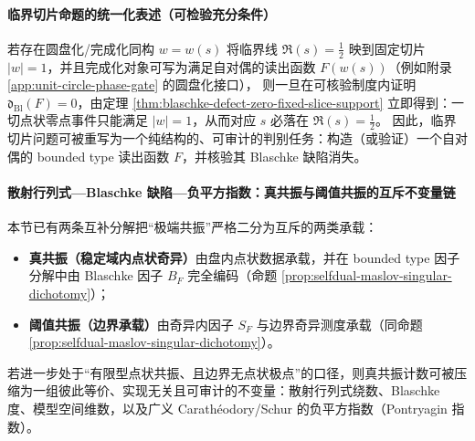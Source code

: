 \paragraph{临界切片命题的统一化表述（可检验充分条件）}
若存在圆盘化/完成化同构 \(w=w(s)\) 将临界线 \(\Re(s)=\tfrac12\) 映到固定切片 \(|w|=1\)，并且完成化对象可写为满足自对偶的读出函数 \(F(w(s))\)（例如附录 \ref{app:unit-circle-phase-gate} 的圆盘化接口），
则一旦在可核验制度内证明 \(\mathfrak{d}_{\mathrm{Bl}}(F)=0\)，由定理 \ref{thm:blaschke-defect-zero-fixed-slice-support} 立即得到：一切点状零点事件只能满足 \(|w|=1\)，从而对应 \(s\) 必落在 \(\Re(s)=\tfrac12\)。
因此，临界切片问题可被重写为一个纯结构的、可审计的判别任务：构造（或验证）一个自对偶的 bounded type 读出函数 \(F\)，并核验其 Blaschke 缺陷消失。

\paragraph{散射行列式—Blaschke 缺陷—负平方指数：真共振与阈值共振的互斥不变量链}\label{par:selfdual-scattering-blaschke-neg-square-chain}
本节已有两条互补分解把“极端共振”严格二分为互斥的两类承载：
\begin{itemize}
  \item \textbf{真共振（稳定域内点状奇异）}由盘内点状数据承载，并在 bounded type 因子分解中由 Blaschke 因子 \(B_F\) 完全编码（命题 \ref{prop:selfdual-maslov-singular-dichotomy}）；
  \item \textbf{阈值共振（边界承载）}由奇异内因子 \(S_F\) 与边界奇异测度承载（同命题 \ref{prop:selfdual-maslov-singular-dichotomy}）。
\end{itemize}
若进一步处于“有限型点状共振、且边界无点状极点”的口径，则真共振计数可被压缩为一组彼此等价、实现无关且可审计的不变量：散射行列式绕数、Blaschke 度、模型空间维数，以及广义 Carath\'eodory/Schur 的负平方指数（Pontryagin 指数）。

